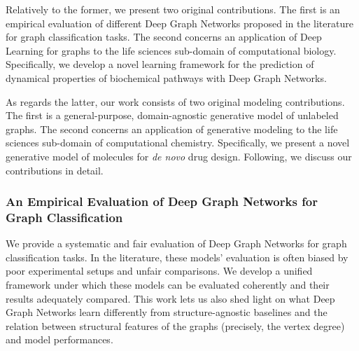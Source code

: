Relatively to the former, we present two original contributions. The first is an empirical evaluation of different Deep Graph Networks proposed in the literature for graph classification tasks. The second concerns an application of Deep Learning for graphs to the life sciences sub-domain of computational biology. Specifically, we develop a novel learning framework for the prediction of dynamical properties of biochemical pathways with Deep Graph Networks.

As regards the latter, our work consists of two original modeling contributions. The first is a general-purpose, domain-agnostic generative model of unlabeled graphs. The second concerns an application of generative modeling to the life sciences sub-domain of computational chemistry. Specifically, we present a novel generative model of molecules for \emph{de novo} drug design. Following, we discuss our contributions in detail.

\subsubsection*{An Empirical Evaluation of Deep Graph Networks for Graph Classification}
We provide a systematic and fair evaluation of Deep Graph Networks for graph classification tasks. In the literature, these models' evaluation is often biased by poor experimental setups and unfair comparisons. We develop a unified framework under which these models can be evaluated coherently and their results adequately compared. This work lets us also shed light on what Deep Graph Networks learn differently from structure-agnostic baselines and the relation between structural features of the graphs (precisely, the vertex degree) and model performances.

